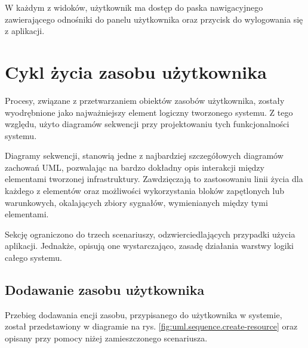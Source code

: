 W każdym z widoków, użytkownik ma dostęp do paska nawigacyjnego zawierającego odnośniki do panelu użytkownika oraz przycisk do wylogowania się z aplikacji. 

\section{Cykl życia zasobu użytkownika}

Procesy, związane z przetwarzaniem obiektów zasobów użytkownika, zostały wyodrębnione jako najważniejszy element logiczny tworzonego systemu. Z tego względu, użyto diagramów sekwencji przy projektowaniu tych funkcjonalności systemu.

Diagramy sekwencji, stanowią jedne z najbardziej szczegółowych diagramów zachowań UML, pozwalając na bardzo dokładny opis interakcji między elementami tworzonej infrastruktury. Zawdzięczają to zastosowaniu linii życia dla każdego z elementów oraz możliwości wykorzystania bloków zapętlonych lub warunkowych, okalających zbiory sygnałów, wymienianych między tymi elementami.

Sekcję ograniczono do trzech scenariuszy, odzwierciedlających przypadki użycia aplikacji. Jednakże, opisują one wystarczająco, zasadę działania warstwy logiki całego systemu.

\subsection{Dodawanie zasobu użytkownika}

Przebieg dodawania encji zasobu, przypisanego do użytkownika w systemie, został przedstawiony w diagramie na rys. \ref{fig:uml.sequence.create-resource} oraz opisany przy pomocy niżej zamieszczonego scenariusza.

